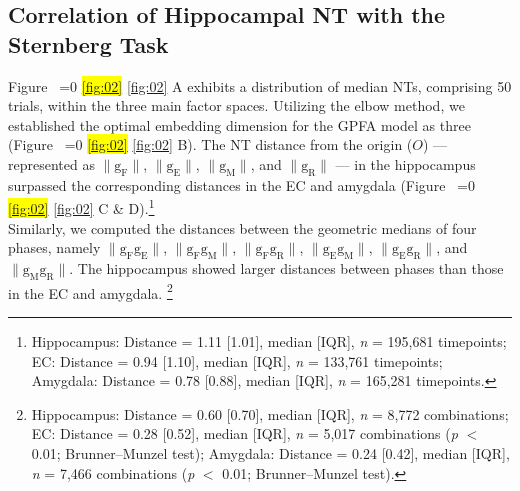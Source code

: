 \documentclass[preprint,review,12pt]{elsarticle}%
\newcommand{\hl}[1]{\colorbox{yellow}{#1}}
\newcommand{\hlref}[1]{%
  \ifnum\getrefnumber{#1}=0
    \hl{\ref*{#1}}%
  \else
    \ref{#1}%
  \fi
}
\begin{document}
\subsection{Correlation of Hippocampal NT with the Sternberg Task}
Figure~\hlref{fig:02}A exhibits a distribution of median NTs, comprising 50 trials, within the three main factor spaces. Utilizing the elbow method, we established the optimal embedding dimension for the GPFA model as three (Figure~\hlref{fig:02}B). The NT distance from the origin ($O$) --- represented as $\mathrm{\lVert g_{F} \rVert}$, $\mathrm{\lVert g_{E} \rVert}$, $\mathrm{\lVert g_{M} \rVert}$, and $\mathrm{\lVert g_{R} \rVert}$ --- in the hippocampus surpassed the corresponding distances in the EC and amygdala (Figure~\hlref{fig:02}C \& D).\footnote{Hippocampus: Distance = 1.11 [1.01], median [IQR], \textit{n} = 195,681 timepoints; EC: Distance = 0.94 [1.10], median [IQR], \textit{n} = 133,761 timepoints; Amygdala: Distance = 0.78 [0.88], median [IQR], \textit{n} = 165,281 timepoints.}
\\
\indent
Similarly, we computed the distances between the geometric medians of four phases, namely $\mathrm{\lVert g_{F}g_{E} \rVert}$, $\mathrm{\lVert g_{F}g_{M} \rVert}$, $\mathrm{\lVert g_{F}g_{R} \rVert}$, $\mathrm{\lVert g_{E}g_{M} \rVert}$, $\mathrm{\lVert g_{E}g_{R} \rVert}$, and $\mathrm{\lVert g_{M}g_{R} \rVert}$. The hippocampus showed larger distances between phases than those in the EC and amygdala. \footnote{Hippocampus: Distance = 0.60 [0.70], median [IQR], \textit{n} = 8,772 combinations; EC: Distance = 0.28 [0.52], median [IQR], \textit{n} = 5,017 combinations (\textit{p} $<$ 0.01; Brunner--Munzel test); Amygdala: Distance = 0.24 [0.42], median [IQR], \textit{n} = 7,466 combinations (\textit{p} $<$ 0.01; Brunner--Munzel test).}
\end{document}
